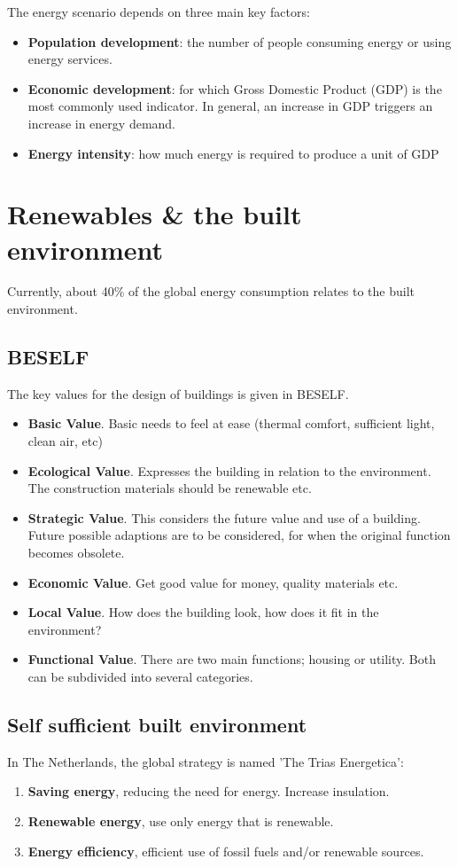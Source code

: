 \documentclass[a4paper,10pt]{article}
\begin{document}
The energy scenario depends on three main key factors:
\begin{itemize}
 \item \textbf{Population development}: the number of people consuming energy or using energy services.
 \item \textbf{Economic development}: for which Gross Domestic Product (GDP) is the most commonly used indicator. In general, an increase in GDP triggers an increase in energy demand.
 \item \textbf{Energy intensity}: how much energy is required to produce a unit of GDP
\end{itemize}



\section{Renewables \& the built environment}
Currently, about 40\% of the global energy consumption relates to the built environment. 

\subsection{BESELF}
The key values for the design of buildings is given in BESELF.
\begin{itemize}
 \item \textbf{Basic Value}. Basic needs to feel at ease (thermal comfort, sufficient light, clean air, etc)
 \item \textbf{Ecological Value}. Expresses the building in relation to the environment. The construction materials should be renewable etc.
 \item \textbf{Strategic Value}. This considers the future value and use of a building. Future possible adaptions are to be considered, for when the original function becomes obsolete. 
 \item \textbf{Economic Value}. Get good value for money, quality materials etc.
 \item \textbf{Local Value}. How does the building look, how does it fit in the environment?
 \item \textbf{Functional Value}. There are two main functions; housing or utility. Both can be subdivided into several categories. 
\end{itemize}

\subsection{Self sufficient built environment}
In The Netherlands, the global strategy is named 'The Trias Energetica':
\begin{enumerate}
 \item \textbf{Saving energy}, reducing the need for energy. Increase insulation.
 \item \textbf{Renewable energy}, use only energy that is renewable.
 \item \textbf{Energy efficiency}, efficient use of fossil fuels and/or renewable sources.
\end{enumerate}
\end{document}
